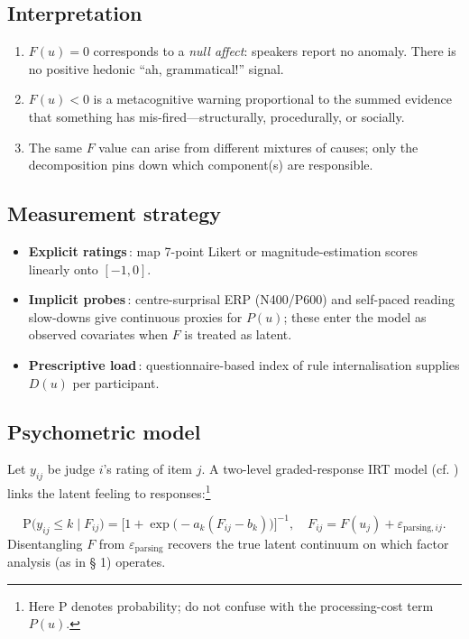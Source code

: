 \documentclass[12pt,letterpaper]{article}
\begin{document}
\subsection{Interpretation}
\begin{enumerate}
\item $F(u)=0$ corresponds to a \emph{null affect}: speakers report no
  anomaly. There is no positive hedonic “ah, grammatical!” signal.
\item $F(u)<0$ is a metacognitive warning proportional to the summed evidence
  that something has mis-fired—structurally, procedurally, or socially.
\item The same $F$ value can arise from different mixtures of causes; only the
  decomposition pins down which component(s) are responsible.
\end{enumerate}

\subsection{Measurement strategy}
\begin{itemize}
  \item \textbf{Explicit ratings}\,: map 7-point Likert or magnitude-estimation
        scores linearly onto $[-1,0]$.
  \item \textbf{Implicit probes}\,: centre-surprisal ERP (N400/P600) and
        self-paced reading slow-downs give continuous proxies for $P(u)$; these
        enter the model as observed covariates when $F$ is treated as latent.
  \item \textbf{Prescriptive load}\,: questionnaire-based index of rule
        internalisation supplies $D(u)$ per participant.
\end{itemize}

\subsection{Psychometric model}
Let $y_{ij}$ be judge $i$’s rating of item $j$.  
A two-level graded-response IRT model (cf. \parencite{samejima1997}) links the
latent feeling to responses:\footnote{Here $\mathrm{P}$ denotes probability; do not confuse with the processing-cost term $P(u)$.}

\[
\mathrm{P}\!\bigl(y_{ij}\le k \mid F_{ij}\bigr)=
      \bigl[1+\exp\bigl(-a_k(F_{ij}-b_k)\bigr)\bigr]^{-1},
\quad
F_{ij}=F(u_j)+\varepsilon_{\!\text{parsing},ij}.
\]
Disentangling $F$ from $\varepsilon_{\!\text{parsing}}$ recovers the true
latent continuum on which factor analysis (as in § 1) operates.
\end{document}
